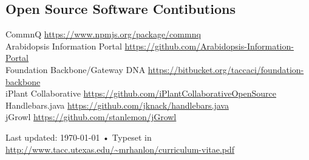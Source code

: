 \documentclass[10pt, a4paper]{article}
\begin{document}
\subsection*{Open Source Software Contibutions}
CommnQ \href{https://www.npmjs.org/package/commnq}{https://www.npmjs.org/package/commnq}\\
Arabidopsis Information Portal \href{https://github.com/Arabidopsis-Information-Portal}{https://github.com/Arabidopsis-Information-Portal}\\
Foundation Backbone/Gateway DNA \href{https://bitbucket.org/taccaci/foundation-backbone}{https://bitbucket.org/taccaci/foundation-backbone}\\
iPlant Collaborative \href{https://github.com/iPlantCollaborativeOpenSource}{https://github.com/iPlantCollaborativeOpenSource}\\
Handlebars.java \href{https://github.com/jknack/handlebars.java}{https://github.com/jknack/handlebars.java}\\
jGrowl \href{https://github.com/stanlemon/jGrowl}{https://github.com/stanlemon/jGrowl}



\vfill{}

\begin{center}
{\scriptsize  Last updated: \today\- •\-
Typeset in \href{http://nitens.org/taraborelli/cvtex}{
\XeTeX }\\
\href{http://www.tacc.utexas.edu/~mrhanlon/curriculum-vitae.pdf}{http://www.tacc.utexas.edu/\textasciitilde{}mrhanlon/curriculum-vitae.pdf}}
\end{center}
\end{document}
